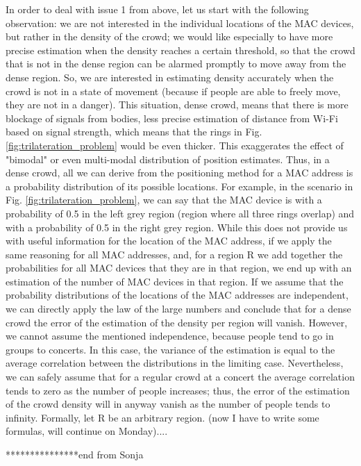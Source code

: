 \documentclass[10pt,a4paper]{article}
\begin{document}
In order to deal with issue 1 from above, let us start with the following observation: we are not interested in the individual locations of the MAC devices, but rather in the density of the crowd; we would like especially to have more precise estimation when the density reaches a certain threshold, so that the crowd that is not in the dense region can be alarmed promptly to move away from the dense region. So, we are interested in estimating density accurately when the crowd is not in a state of movement (because if people are able to freely move, they are not in a danger). 
This situation, dense crowd, means that there is more blockage of signals from bodies, less precise estimation of distance from Wi-Fi based on signal strength, which means that the rings in Fig.\ref{fig:trilateration_problem} would be even thicker. This exaggerates the effect of "bimodal" or even multi-modal distribution of position estimates. Thus, in a dense crowd, all we can derive from the positioning method for a MAC address is a probability distribution of its possible locations. For example, in the scenario in Fig. \ref{fig:trilateration_problem}, we can say that the MAC device is with a probability of 0.5 in the left grey region (region where all three rings overlap) and with a probability of 0.5 in the right grey region. While this does not provide us with useful information for the location of the MAC address, if we apply the same reasoning for all MAC addresses, and, for a region R we add together the probabilities for all MAC devices that they are in that region, we end up with an estimation of the number of MAC devices in that region. If we assume that the probability distributions of the locations of the MAC addresses are independent, we can directly apply the law of the large numbers and conclude that for a dense crowd the error of the estimation of the density per region will vanish. However, we cannot assume the mentioned independence, because people tend to go in groups to concerts. In this case, the variance of the estimation is equal to the average correlation between the distributions in the limiting case. Nevertheless, we can safely assume that for a regular crowd at a concert the average correlation tends to zero as the number of people increases; thus, the error of the estimation of the crowd density will in anyway vanish as the number of people tends to infinity. Formally, let R be an arbitrary region. (now I have to write some formulas, will continue on Monday)....



***************end from Sonja
\end{document}
